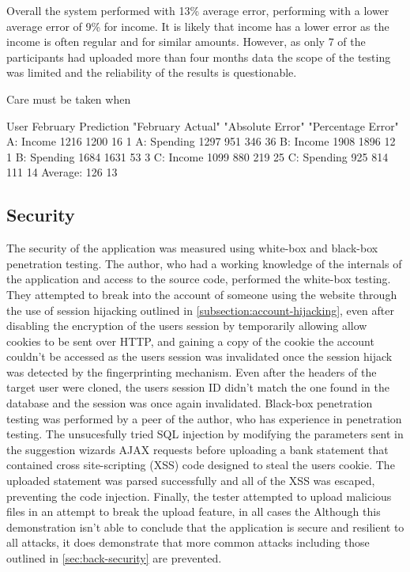Overall the system performed with 13\% average error, performing with a lower average error of 9\% for income. It is likely that income has a lower error as the income is often regular and for similar amounts.
%
However, as only 7 of the participants had uploaded more than four months data the scope of the testing was limited and the reliability of the results is questionable.

Care must be taken when 

User	February Prediction	"February Actual"	"Absolute Error"	"Percentage Error"
A: Income	1216	1200	16	1%
A: Spending	1297	951	    346	36%
B: Income	1908	1896	12	1%
B: Spending	1684	1631	53	3%
C: Income   1099	880	    219	25%
C: Spending	925	    814	    111	14%
		Average:	126	        13%

\subsection{Security}
The security of the application was measured using white-box and black-box penetration testing.
%
The author, who had a working knowledge of the internals of the application and access to the source code, performed the white-box testing. They attempted to break into the account of someone using the website through the use of session hijacking outlined in \autoref{subsection:account-hijacking}, even after disabling the encryption of the users session by temporarily allowing allow cookies to be sent over HTTP, and gaining a copy of the cookie the account couldn't be accessed as the users session was invalidated once the session hijack was detected by the fingerprinting mechanism. Even after the headers of the target user were cloned, the users session ID didn't match the one found in the database and the session was once again invalidated.
%
Black-box penetration testing was performed by a peer of the author, who has experience in penetration testing. The unsucesfully tried SQL injection by modifying the parameters sent in the suggestion wizards AJAX requests before uploading a bank statement that contained cross site-scripting (XSS) code designed to steal the users cookie. The uploaded statement was parsed successfully and all of the XSS was escaped, preventing the code injection. Finally, the tester attempted to upload malicious files in an attempt to break the upload feature, in all cases the 
%
Although this demonstration isn't able to conclude that the application is secure and resilient to all attacks, it does demonstrate that more common attacks including those outlined in \autoref{sec:back-security} are prevented.
